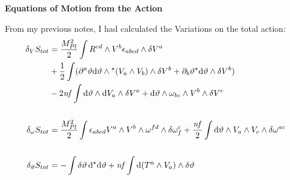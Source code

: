 \documentclass[12pt]{article}
\newcommand{\hodge}{{^\star}}
\begin{document}
\begin{center}
  \Large\textbf{Equations of Motion from the Action} \\
  \large{}
\end{center}

From my previous notes, I had calculated the Variations on the total action:
\begin{align}
  \var_V{S_{tot}} &= \frac{M_{Pl}^2}{2}\int R^{cd} \wedge V^b \epsilon_{abcd} \wedge \var V^a \nonumber \\ &+ \frac{1}{2} \int (\partial^a\vartheta \dd\vartheta \wedge \hodge(V_a \wedge V_b) \wedge \var{V^b} + \partial_b\vartheta \hodge\dd\vartheta \wedge \var{V^b}) \nonumber \\ &-2\mathit{nf} \int \dd\vartheta \wedge \dd V_a \wedge \var{V^a} + \dd\vartheta \wedge \omega_{bc} \wedge V^b \wedge \var{V^c} \\ \nonumber \\
  \var_\omega{S_{tot}} &= \frac{M_{Pl}^2}{2} \int \epsilon_{abcd} V^a \wedge V^b \wedge \omega^{fd} \wedge \var{\omega^c_f} + \frac{\mathit{nf}}{2} \int \dd{\vartheta} \wedge V_a \wedge V_c \wedge \var{\omega^{ac}} \\ \nonumber \\
  \var_\vartheta{S_{tot}} &= - \int \var{\vartheta}\dd{\hodge{\dd{\vartheta}}} + \mathit{nf} \int \dd(T^a \wedge V_a) \wedge \var{\vartheta}
\end{align}
\end{document}
